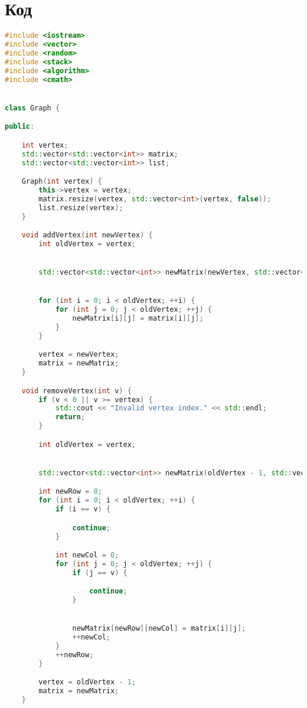 \documentclass{article}
\begin{document}
\section{Код}
\begin {small}
\begin{lstlisting}[language=C++]
#include <iostream>
#include <vector>
#include <random>
#include <stack>
#include <algorithm>
#include <cmath>


class Graph {

public:

    int vertex;
    std::vector<std::vector<int>> matrix;
    std::vector<std::vector<int>> list;

    Graph(int vertex) {
        this->vertex = vertex;
        matrix.resize(vertex, std::vector<int>(vertex, false));
        list.resize(vertex);
    }

    void addVertex(int newVertex) {
        int oldVertex = vertex;


        std::vector<std::vector<int>> newMatrix(newVertex, std::vector<int>(newVertex, false));


        for (int i = 0; i < oldVertex; ++i) {
            for (int j = 0; j < oldVertex; ++j) {
                newMatrix[i][j] = matrix[i][j];
            }
        }

        vertex = newVertex;
        matrix = newMatrix;
    }

    void removeVertex(int v) {
        if (v < 0 || v >= vertex) {
            std::cout << "Invalid vertex index." << std::endl;
            return;
        }

        int oldVertex = vertex;


        std::vector<std::vector<int>> newMatrix(oldVertex - 1, std::vector<int>(oldVertex - 1, false));

        int newRow = 0;
        for (int i = 0; i < oldVertex; ++i) {
            if (i == v) {

                continue;
            }

            int newCol = 0;
            for (int j = 0; j < oldVertex; ++j) {
                if (j == v) {

                    continue;
                }


                newMatrix[newRow][newCol] = matrix[i][j];
                ++newCol;
            }
            ++newRow;
        }

        vertex = oldVertex - 1;
        matrix = newMatrix;
    }



\end{lstlisting}
\end{small}
\end{document}

